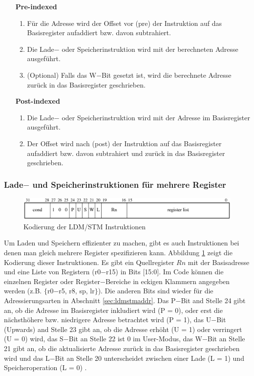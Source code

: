 \documentclass[a4paper, 11pt, onecolumn]{article}
\begin{document}
\begin{itemize}[labelwidth=7.5em,leftmargin =\dimexpr{}+\relax, align=parleft]
\item[\textbf{Pre-indexed}]
\begin{enumerate}[labelindent=0em,labelsep=0.5cm,leftmargin=*]
\item Für die Adresse wird der Offset vor (pre) der Instruktion auf das Basisregister aufaddiert bzw. davon subtrahiert.
\item Die Lade$-$ oder Speicherinstruktion wird mit der berechneten Adresse ausgeführt.
\item (Optional) Falls das W$-$Bit gesetzt ist, wird die berechnete Adresse zurück in das Basisregister geschrieben.
\end{enumerate}
\item[\textbf{Post-indexed}]
\begin{enumerate}[labelindent=0em,labelsep=0.5cm,leftmargin=*]
\item Die Lade$-$ oder Speicherinstruktion wird mit der Adresse im Basisregister ausgeführt.
\item Der Offset wird nach (post) der Instruktion auf das Basisregister aufaddiert bzw. davon subtrahiert und zurück in das Basisregister geschrieben.
\end{enumerate}
\end{itemize}

\subsubsection{Lade$-$ und Speicherinstruktionen für mehrere Register}

\begin{figure}[!htb]
\centering
\includegraphics[width=1\textwidth]{data/ldmstm}
\caption{Kodierung der LDM/STM Instruktionen \cite{arm:2005}}
\label{fig:ldmstm}
\end{figure}

Um Laden und Speichern effizienter zu machen, gibt es auch Instruktionen bei denen man gleich mehrere Register spezifizieren kann. Abbildung \ref{fig:ldmstm} zeigt die Kodierung dieser Instruktionen. Es gibt ein Quellregister $Rn$ mit der Basisadresse und eine Liste von Registern (r0$-$r15) in Bits $[$15:0$]$. Im Code können die einzelnen Register oder Register$-$Bereiche in eckigen Klammern angegeben werden (z.B. $\lbrace$r0$-$r5, r8, sp, lr$\rbrace$). Die anderen Bits sind wieder für die Adressierungsarten in Abschnitt \ref{sec:ldmstmaddr}. Das P$-$Bit and Stelle 24 gibt an, ob die Adresse im Basisregister inkludiert wird (P = 0), oder erst die nächsthöhere bzw. niedrigere Adresse betrachtet wird (P = 1), das U$-$Bit (Upwards) and Stelle 23 gibt an, ob die Adresse erhöht (U = 1) oder verringert (U = 0) wird, das S$-$Bit an Stelle 22 ist 0 im User-Modus, das W$-$Bit an Stelle 21 gibt an, ob die aktualisierte Adresse zurück in das Basisregister geschrieben wird und das L$-$Bit an Stelle 20 unterscheidet zwischen einer Lade (L = 1) und Speicheroperation (L = 0) \cite{arm:2005}.
\end{document}

